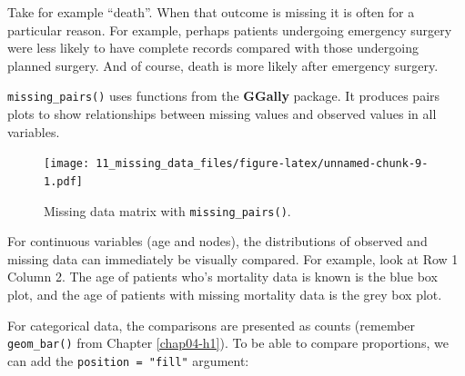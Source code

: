 \documentclass[
  12pt,
  krantz2]{krantz}
\makeatletter
\newenvironment{Shaded}{\begin{snugshade}}{\end{snugshade}}
\newcommand{\DataTypeTok}[1]{\textcolor[rgb]{0.13,0.29,0.53}{#1}}
\newcommand{\KeywordTok}[1]{\textcolor[rgb]{0.13,0.29,0.53}{\textbf{#1}}}
\newcommand{\NormalTok}[1]{#1}
\newcommand{\OperatorTok}[1]{\textcolor[rgb]{0.81,0.36,0.00}{\textbf{#1}}}
\newcommand{\StringTok}[1]{\textcolor[rgb]{0.31,0.60,0.02}{#1}}
\newenvironment{kframe}{%
\medskip{}
\setlength{\fboxsep}{.8em}
 \def\at@end@of@kframe{}%
 \ifinner\ifhmode%
  \def\at@end@of@kframe{\end{minipage}}%
  \begin{minipage}{\columnwidth}%
 \fi\fi%
 \def\FrameCommand##1{\hskip\@totalleftmargin \hskip-\fboxsep
 \colorbox{shadecolor}{##1}\hskip-\fboxsep
     \hskip-\linewidth \hskip-\@totalleftmargin \hskip\columnwidth}%
 \MakeFramed {\advance\hsize-\width
   \@totalleftmargin\z@ \linewidth\hsize
   \@setminipage}}%
 {\par\unskip\endMakeFramed%
 \at@end@of@kframe}
\renewenvironment{Shaded}{\begin{kframe}}{\end{kframe}}
\makeatother
\begin{document}
Take for example ``death''.
When that outcome is missing it is often for a particular reason.
For example, perhaps patients undergoing emergency surgery were less likely to have complete records compared with those undergoing planned surgery.
And of course, death is more likely after emergency surgery.

\texttt{missing\_pairs()} uses functions from the \textbf{GGally} package.
It produces pairs plots to show relationships between missing values and observed values in all variables.

\begin{Shaded}
\end{Shaded}

\begin{figure}
\centering
\texttt{[image: 11\_missing\_data\_files/figure-latex/unnamed-chunk-9-1.pdf]}
\caption{\label{fig:unnamed-chunk-9}Missing data matrix with \texttt{missing\_pairs()}.}
\end{figure}

For continuous variables (age and nodes), the distributions of observed and missing data can immediately be visually compared.
For example, look at Row 1 Column 2.
The age of patients who's mortality data is known is the blue box plot, and the age of patients with missing mortality data is the grey box plot.

For categorical data, the comparisons are presented as counts (remember \texttt{geom\_bar()} from Chapter \ref{chap04-h1}).
To be able to compare proportions, we can add the \texttt{position\ =\ "fill"} argument:

\begin{Shaded}
\end{Shaded}
\end{document}
